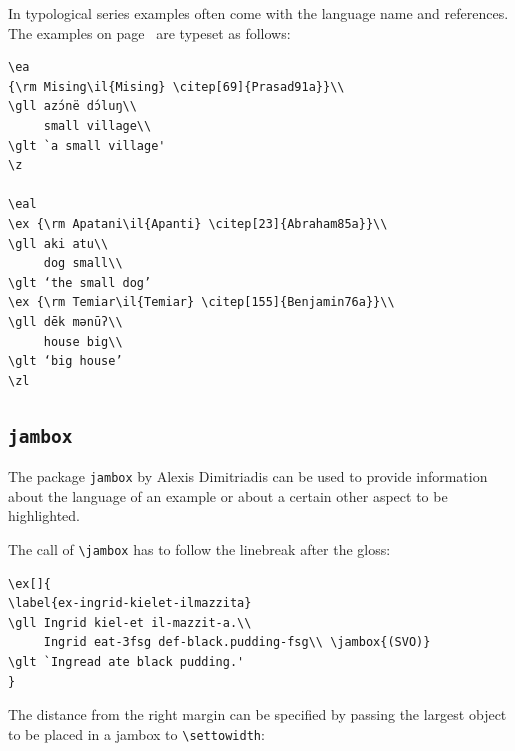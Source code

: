 In typological series examples often come with the language name and references. The examples on
page~\pageref{ex-typology} are typeset as follows:
\begin{verbatim}
\ea
{\rm Mising\il{Mising} \citep[69]{Prasad91a}}\\
\gll azɔ́në dɔ́luŋ\\
     small village\\ 
\glt `a small village' 
\z

\eal
\ex {\rm Apatani\il{Apanti} \citep[23]{Abraham85a}}\\
\gll aki atu\\ 
     dog small\\ 
\glt ‘the small dog’ 
\ex {\rm Temiar\il{Temiar} \citep[155]{Benjamin76a}}\\ 
\gll dēk mənūʔ\\
     house big\\
\glt ‘big house’ 
\zl
\end{verbatim}


\subsection{\texttt{jam\-box}}
\label{sec-jambox}


The package \texttt{jambox} by Alexis Dimitriadis can be used to provide information about the language of an example or
about a certain other aspect to be highlighted.
\settowidth{}
\eal
{}
\zl

The call of \verb+\jambox+ has to follow the linebreak after the gloss:
\begin{verbatim}
\ex[]{
\label{ex-ingrid-kielet-ilmazzita}
\gll Ingrid kiel-et il-mazzit-a.\\
     Ingrid eat-3fsg def-black.pudding-fsg\\ \jambox{(SVO)}
\glt `Ingread ate black pudding.'
}
\end{verbatim}
The distance from the right margin can be specified by passing the largest object to be placed in a
jambox to \verb+\settowidth+:

